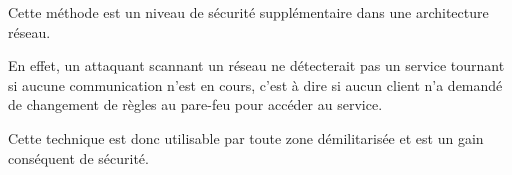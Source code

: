Cette méthode est un niveau de sécurité supplémentaire dans une architecture réseau. 

En effet, un attaquant scannant un réseau ne détecterait pas un service tournant si aucune communication n'est en cours, c'est à dire si aucun client n'a demandé de changement de règles au pare-feu pour accéder au service.

Cette technique est donc utilisable par toute zone démilitarisée et est un gain conséquent de sécurité.

